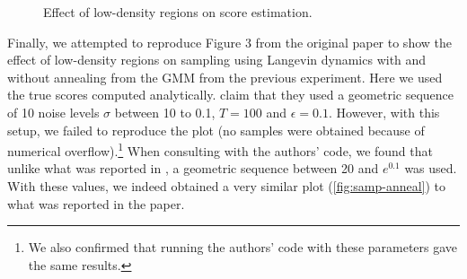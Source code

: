 \begin{figure}[H]
     \caption{Effect of low-density regions on score estimation.}
     \label{fig:toy2}
     \vspace{-3mm}
\end{figure}


Finally, we attempted to reproduce Figure 3 from the original paper to show the effect of low-density regions on sampling using Langevin dynamics with and without annealing from the GMM from the previous experiment. Here we used the true scores computed analytically. \citet{ncsn-paper} claim that they used a geometric sequence of 10 noise levels $\sigma$ between 10 to 0.1, $T=100$ and $\epsilon=0.1$. However, with this setup, we failed to reproduce the plot (no samples were obtained because of numerical overflow).\footnote{We also confirmed that running the authors' code with these parameters gave the same results.} When consulting with the authors' code, we found that unlike what was reported in \citep{ncsn-paper}, a geometric sequence between 20 and $e^{0.1}$ was used. With these values, we indeed obtained a very similar plot (\autoref{fig:samp-anneal}) to what was reported in the paper.

